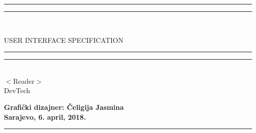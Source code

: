 \documentclass{scrreprt}
\date{}
\begin{document}
\begin{titlepage}
\begin{flushright}
    \rule[0.5ex]{\linewidth}{2pt}\vspace*{-\baselineskip}\vspace*{3.2pt}
    \rule[0.5ex]{\linewidth}{1pt}\\[\baselineskip]
    \begin{bfseries}
        \Huge{USER INTERFACE SPECIFICATION}\\
            \rule[0.5ex]{\linewidth}{2pt}\vspace*{-\baselineskip}\vspace*{3.2pt}
    \rule[0.5ex]{\linewidth}{1pt}\\[\baselineskip]
        \vspace{1.9cm}
        \vspace{0.7cm}
        $<$Reader$>$\\
        \vspace{3cm}
        \vspace{0.7cm}
        DevTech\\
        \vspace{2cm}
    \end{bfseries}
\end{flushright}

\begin{flushleft}
  
\end{flushleft}

\begin{center}        
    \Large{\textbf{Grafički dizajner: Čeligija Jasmina\\}}
    \vspace{2.5cm}  
    \Large\textbf{Sarajevo, 6. april, 2018.} 
    \rule[0.5ex]{\linewidth}{2pt}\vspace*{-\baselineskip}\vspace*{3.2pt}
\end{center}

\end{titlepage}

\tableofcontents



\end{document}
